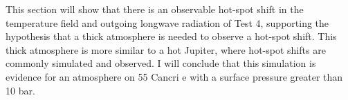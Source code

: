 This section will show that there is an observable hot-spot shift in the temperature field and outgoing longwave radiation of Test 4, supporting the hypothesis that a thick atmosphere is needed to observe a hot-spot shift. This thick atmosphere is more similar to a hot Jupiter, where hot-spot shifts are commonly simulated and observed. I will conclude that this simulation is evidence for an atmosphere on 55 Cancri e with a surface pressure greater than 10 bar.


%





